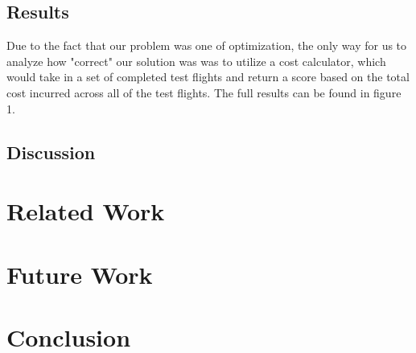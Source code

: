 \documentclass{article}[12pt]
\begin{document}
\begin{multicols}{2}
\subsection{Results}
Due to the fact that our problem was one of optimization, the only way for us to analyze how "correct" our solution was was to utilize a cost calculator, which would take in a set of completed test flights and return a score based on the total cost incurred across all of the test flights. The full results can be found in figure 1. 
\subsection{Discussion}
\section{Related Work}

\section{Future Work}

\section{Conclusion}


\end{multicols}
\end{document}
